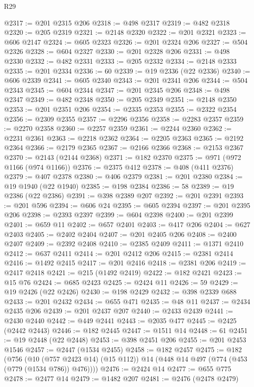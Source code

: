 \begin{lexlean}{R29}
\begin{coremodule}
@2317 := @201 @2315 @206
@2318 := @498 @2317
@2319 := @482 @2318
@2320 := @205 @2319
@2321 := @2148 @2320
@2322 := @201 @2321
@2323 := @606 @2147
@2324 := @605 @2323
@2326 := @201 @2324 @206
@2327 := @504 @2326
@2328 := @604 @2327
@2330 := @201 @2328 @206
@2331 := @498 @2330
@2332 := @482 @2331
@2333 := @205 @2332
@2334 := @2148 @2333
@2335 := @201 @2334
@2336 := 60
@2339 := @19 @2336 (@22 @2336)
@2340 := @606 @2339
@2341 := @605 @2340
@2343 := @201 @2341 @206
@2344 := @504 @2343
@2345 := @604 @2344
@2347 := @201 @2345 @206
@2348 := @498 @2347
@2349 := @482 @2348
@2350 := @205 @2349
@2351 := @2148 @2350
@2353 := @201 @2351 @206
@2354 := @2335 @2353
@2355 := @2322 @2354
@2356 := @2309 @2355
@2357 := @2296 @2356
@2358 := @2283 @2357
@2359 := @2270 @2358
@2360 := @2257 @2359
@2361 := @2244 @2360
@2362 := @2231 @2361
@2363 := @2218 @2362
@2364 := @2205 @2363
@2365 := @2192 @2364
@2366 := @2179 @2365
@2367 := @2166 @2366
@2368 := @2153 @2367
@2370 := @2143 (@2144 @2368)
@2371 := @182 @2370
@2375 := @971 (@972 @1166 (@974 @1166))
@2376 := @2375 @412
@2378 := @408 (@411 @2376)
@2379 := @407 @2378
@2380 := @406 @2379
@2381 := @201 @2380
@2384 := @19 @1940 (@22 @1940)
@2385 := @198 @2384
@2386 := 58
@2389 := @19 @2386 (@22 @2386)
@2391 := @398 @2389 @207
@2392 := @201 @2391
@2393 := @201 @596
@2394 := @606 @24
@2395 := @605 @2394
@2397 := @201 @2395 @206
@2398 := @2393 @2397
@2399 := @604 @2398
@2400 := @201 @2399
@2401 := @659 @11
@2402 := @657 @2401
@2403 := @417 @206
@2404 := @627 @2403
@2405 := @2402 @2404
@2407 := @201 @2405 @206
@2408 := @2400 @2407
@2409 := @2392 @2408
@2410 := @2385 @2409
@2411 := @1371 @2410
@2412 := @637 @2411
@2414 := @201 @2412 @206
@2415 := @2381 @2414
@2416 := @1492 @2415
@2417 := @201 @2416
@2418 := @2381 @206
@2419 := @2417 @2418
@2421 := @215 (@1492 @2419)
@2422 := @182 @2421
@2423 := @15 @76
@2424 := @685 @2423
@2425 := @2424 @11
@2426 := 59
@2429 := @19 @2426 (@22 @2426)
@2430 := @198 @2429
@2432 := @398 @2339 @688
@2433 := @201 @2432
@2434 := @655 @471
@2435 := @48 @11
@2437 := @2434 @2435 @206
@2439 := @201 @2437 @207
@2440 := @2433 @2439
@2441 := @2430 @2440
@2442 := @449 @2441
@2443 := @2035 @477
@2445 := @2425 (@2442 @2443)
@2446 := @182 @2445
@2447 := @1511 @14
@2448 := 61
@2451 := @19 @2448 (@22 @2448)
@2453 := @398 @2451 @206
@2455 := @201 @2453 @1546
@2457 := @2447 (@1534 @2455)
@2458 := @182 @2457
@2475 := @182
    (@756
      (@10 (@757 @2423 @14) (@15 @112))
      @14
      (@448 @14 @497 (@774 (@453 (@779 (@1534 @786)) @476))))
@2476 := @2424 @14
@2477 := @655 @775
@2478 := @2477 @14
@2479 := @1482 @207
@2481 := @2476 (@2478 @2479)

\end{coremodule}
\end{lexlean}
